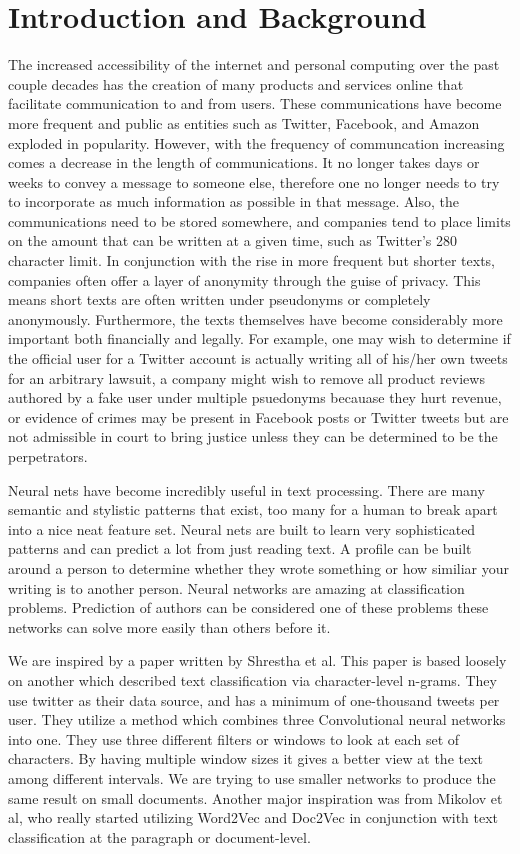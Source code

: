 \documentclass[conference]{IEEEtran}
\begin{document}
\section{Introduction and Background}
The increased accessibility of the internet and personal computing over the past couple decades has the creation of many products and services online that facilitate communication to and from users. These communications have become more frequent and public as entities such as Twitter, Facebook, and Amazon exploded in popularity. However, with the frequency of communcation increasing comes a decrease in the length of communications. It no longer takes days or weeks to convey a message to someone else, therefore one no longer needs to try to incorporate as much information as possible in that message. Also, the communications need to be stored somewhere, and companies tend to place limits on the amount that can be written at a given time, such as Twitter's 280 character limit. In conjunction with the rise in more frequent but shorter texts, companies often offer a layer of anonymity through the guise of privacy. This means short texts are often written under pseudonyms or completely anonymously. Furthermore, the texts themselves have become considerably more important both financially and legally.\cite{b1} For example, one may wish to determine if the official user for a Twitter account is actually writing all of his/her own tweets for an arbitrary lawsuit, a company might wish to remove all product reviews authored by a fake user under multiple psuedonyms becauase they hurt revenue,  or evidence of crimes may be present in Facebook posts or Twitter tweets but are not admissible in court to bring justice unless they can be determined to be the perpetrators.

Neural nets have become incredibly useful in text processing. There are many semantic and stylistic patterns that exist, too many for a human to break apart into a nice neat feature set. Neural nets are built to learn very sophisticated patterns and can predict a lot from just reading text. A profile can be built around a person to determine whether they wrote something or how similiar your writing is to another person. Neural networks are amazing at classification problems. Prediction of authors can be considered one of these problems these networks can solve more easily than others before it.

We are inspired by a paper written by Shrestha et al. This paper is based loosely on another which described text classification via character-level n-grams. They use twitter as their data source, and has a minimum of one-thousand tweets per user. They utilize a method which combines three Convolutional neural networks into one. They use three different filters or windows to look at each set of characters. By having multiple window sizes it gives a better view at the text among different intervals. We are trying to use smaller networks to produce the same result on small documents. Another major inspiration was from Mikolov et al, who really started utilizing Word2Vec and Doc2Vec in conjunction with text classification at the paragraph or document-level.\cite{b2,b3,b4}
\end{document}
